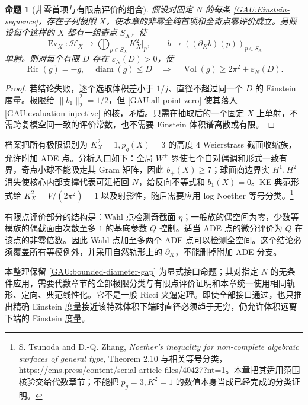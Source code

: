 \documentclass[UTF8,fontset=fandol,zihao=-4,oneside,openany]{ctexbook}
\theoremstyle{cjkplain}
\newtheorem{proposition}[theorem]{命题}
\numberwithin{equation}{chapter}
\begin{document}
\begin{proposition}[非零首项与有限点评价的组合]\label{GAU:gap-conditional}
假设对固定 $N$ 的每条 \eqref{GAU:Einstein-sequence}，存在子列极限 $X$，使本章的非零全纯首项和全奇点零评价成立。另假设每个这样的 $X$ 都有一组奇点 $S_X$，使
\begin{equation}\label{GAU:evaluation-injective}
\operatorname{Ev}_X:\mathcal H_X\longrightarrow
\bigoplus_{p\in S_X}K_X^2|_p,
\qquad b\longmapsto((\partial_Kb)(p))_{p\in S_X}
\end{equation}
单射。则对每个有限 $D$ 存在 $\varepsilon_N(D)>0$，使
\begin{equation}\label{GAU:bounded-diameter-gap}
\operatorname{Ric}(g)=-g,\quad\operatorname{diam}(g)\le D
\quad\Longrightarrow\quad
\operatorname{Vol}(g)\ge2\pi^2+\varepsilon_N(D).
\end{equation}
\end{proposition}
\begin{proof}
若结论失败，逐个选取体积差小于 $1/j$、直径不超过同一个 $D$ 的 Einstein 度量。极限给 $\|b_1\|_2^2=1/2$，但 \eqref{GAU:all-point-zero} 使其落入 \eqref{GAU:evaluation-injective} 的核，矛盾。只需在抽取后的一个固定 $X$ 上单射，不需跨复模空间一致的评价常数，也不需要 Einstein 体积谱离散或有限。
\end{proof}

档案把所有极限识别为 $K_X^2=1,p_g(X)=3$ 的高度 $4$ Weierstrass 截面收缩族，允许附加 ADE 点。分析入口如下：全局 $W^+$ 界使七个自对偶调和形式一致有界，奇点小球不能吸走其 Gram 矩阵，因此 $b_+(X)\ge7$；球面商边界实 $H^1,H^2$ 消失使核心内部支撑代表可延拓回 $N$，给反向不等式和 $b_1(X)=0$。KE 典范形式给 $K_X^2=V/(2\pi^2)=1$ 以及射影性，随后需要应用 log Noether 等号分类。\footnote{S. Tsunoda and D.-Q. Zhang, \emph{Noether's inequality for non-complete algebraic surfaces of general type}, Theorem 2.10 与相关等号分类，\url{https://ems.press/content/serial-article-files/40427?nt=1}。本章把其适用范围核验交给代数章节；不能把 $p_g=3,K^2=1$ 的数值本身当成已经完成的分类证明。}

有限点评价部分的结构是：Wahl 点检测奇截面 $\eta$；一般族的偶空间为零，少数等模族的偶截面由次数至多 $1$ 的基底参数 $Q$ 控制。适当 ADE 点的微分评价为 $Q$ 在该点的非零倍数。因此 Wahl 点加至多两个 ADE 点可以检测全空间。这个结论必须覆盖所有等模例外，并采用自然轨形上的 $\partial_K$，不能删掉附加 ADE 分支。

本整理保留 \eqref{GAU:bounded-diameter-gap} 为显式接口命题；其对指定 $N$ 的无条件应用，需要代数章节的全部极限分类与有限点评价证明和本章统一使用相同轨形、定向、典范线性化。它不是一般 Ricci 夹逼定理。即使全部接口通过，也只推出精确 Einstein 度量接近该特殊体积下端时直径必须趋于无穷，仍允许体积远离下端的 Einstein 度量。
\end{document}
